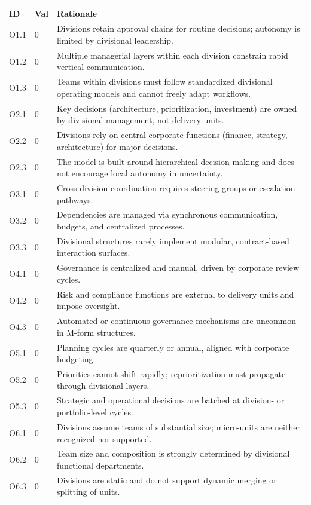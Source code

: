 \documentclass[11pt, a4paper, twocolumn]{article} %
\begin{document}
\begin{table}[h]
\centering
\begingroup\small
\setlength{\tabcolsep}{4pt}%
\begin{tabularx}{\linewidth}{llX}
\toprule
\textbf{ID} & \textbf{Val} & \textbf{Rationale} \\
\midrule
O1.1 & 0 &
Divisions retain approval chains for routine decisions; autonomy is limited by divisional leadership. \\
O1.2 & 0 &
Multiple managerial layers within each division constrain rapid vertical communication. \\
O1.3 & 0 &
Teams within divisions must follow standardized divisional operating models and cannot freely adapt workflows. \\
\midrule
O2.1 & 0 &
Key decisions (architecture, prioritization, investment) are owned by divisional management, not delivery units. \\
O2.2 & 0 &
Divisions rely on central corporate functions (finance, strategy, architecture) for major decisions. \\
O2.3 & 0 &
The model is built around hierarchical decision-making and does not encourage local autonomy in uncertainty. \\
\midrule
O3.1 & 0 &
Cross-division coordination requires steering groups or escalation pathways. \\
O3.2 & 0 &
Dependencies are managed via synchronous communication, budgets, and centralized processes. \\
O3.3 & 0 &
Divisional structures rarely implement modular, contract-based interaction surfaces. \\
\midrule
O4.1 & 0 &
Governance is centralized and manual, driven by corporate review cycles. \\
O4.2 & 0 &
Risk and compliance functions are external to delivery units and impose oversight. \\
O4.3 & 0 &
Automated or continuous governance mechanisms are uncommon in M-form structures. \\
\midrule
O5.1 & 0 &
Planning cycles are quarterly or annual, aligned with corporate budgeting. \\
O5.2 & 0 &
Priorities cannot shift rapidly; reprioritization must propagate through divisional layers. \\
O5.3 & 0 &
Strategic and operational decisions are batched at division- or portfolio-level cycles. \\
\midrule
O6.1 & 0 &
Divisions assume teams of substantial size; micro-units are neither recognized nor supported. \\
O6.2 & 0 &
Team size and composition is strongly determined by divisional functional departments. \\
O6.3 & 0 &
Divisions are static and do not support dynamic merging or splitting of units. \\
\bottomrule
\end{tabularx}
\endgroup
\end{table}
\end{document}
